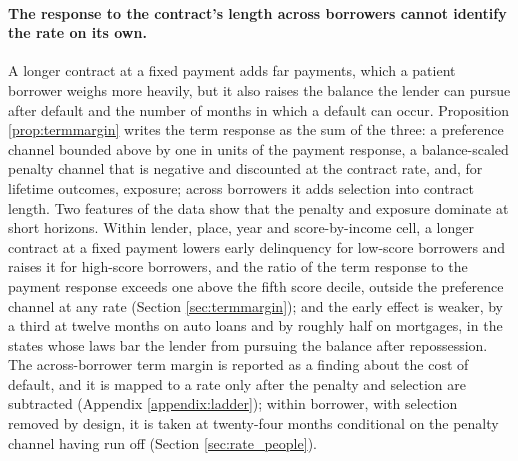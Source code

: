\paragraph{The response to the contract's length across borrowers cannot identify the rate on its own.} A longer contract at a fixed payment adds far payments, which a patient borrower weighs more heavily, but it also raises the balance the lender can pursue after default and the number of months in which a default can occur. Proposition \ref{prop:termmargin} writes the term response as the sum of the three: a preference channel bounded above by one in units of the payment response, a balance-scaled penalty channel that is negative and discounted at the contract rate, and, for lifetime outcomes, exposure; across borrowers it adds selection into contract length. Two features of the data show that the penalty and exposure dominate at short horizons. Within lender, place, year and score-by-income cell, a longer contract at a fixed payment lowers early delinquency for low-score borrowers and raises it for high-score borrowers, and the ratio of the term response to the payment response exceeds one above the fifth score decile, outside the preference channel at any rate (Section \ref{sec:termmargin}); and the early effect is weaker, by a third at twelve months on auto loans and by roughly half on mortgages, in the states whose laws bar the lender from pursuing the balance after repossession. The across-borrower term margin is reported as a finding about the cost of default, and it is mapped to a rate only after the penalty and selection are subtracted (Appendix \ref{appendix:ladder}); within borrower, with selection removed by design, it is taken at twenty-four months conditional on the penalty channel having run off (Section \ref{sec:rate_people}).

